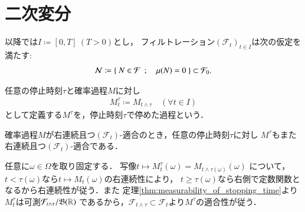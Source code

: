 \section{二次変分}
	以降では$I \coloneqq [0,T]\ (T>0)$とし，
	フィルトレーション$(\mathcal{F}_t)_{t \in I}$は次の仮定を満たす:
	\begin{align}
		\mathcal{N} \coloneqq \left\{\ N \in \mathcal{F}\ \, ; \quad \mu(N) = 0\ \right\}
		\subset \mathcal{F}_0.
	\end{align}
	
	\begin{screen}
		\begin{dfn}[停止時刻で停めた過程]
			任意の停止時刻$\tau$と確率過程$M$に対し
			\begin{align}
				M^\tau_t \coloneqq M_{t \wedge \tau}
				\quad (\forall t \in I)
			\end{align}
			として定義する$M^\tau$を，停止時刻$\tau$で停めた過程という．
			
		\end{dfn}
	\end{screen}
	
	\begin{screen}
		\begin{prp}[停めた過程の適合性]
			確率過程$M$が右連続且つ$(\mathcal{F}_t)$-適合のとき，任意の停止時刻$\tau$に対し
			$M^\tau$もまた右連続且つ$(\mathcal{F}_t)$-適合である．
		\end{prp}
	\end{screen}
	
	\begin{prf}
		任意に$\omega \in \Omega$を取り固定する．
		写像$t \longmapsto M_t^\tau(\omega) = M_{t \wedge \tau(\omega)}(\omega)$
		について，$t < \tau(\omega)$なら$t \longmapsto M_t(\omega)$の右連続性により，
		$t \geq \tau(\omega)$なら右側で定数関数となるから右連続性が従う．また
		定理\ref{thm:measurability_of_stopping_time}より
		$M_t^{\tau}$は可測$\mathcal{F}_{t \wedge \tau}/\mathfrak{B}(\mathbb{R})$
		であるから，$\mathcal{F}_{t\wedge \tau} \subset \mathcal{F}_t$より$M^\tau$の適合性が従う．
		\QED
	\end{prf}
	
